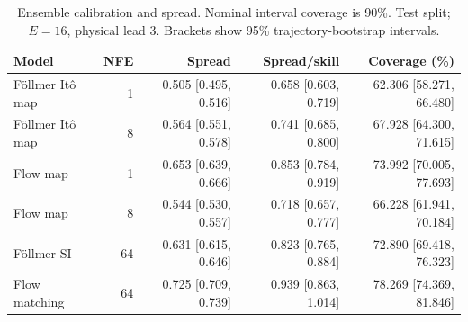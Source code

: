 \begin{table}[t]
\centering
\small
\setlength{\tabcolsep}{3pt}
\caption{Ensemble calibration and spread. Nominal interval coverage is 90\%. Test split; $E=16$, physical lead 3. Brackets show 95\% trajectory-bootstrap intervals.}
\label{tab:map-calibration}
\begin{tabular}{lrrrr}
\toprule
Model & NFE & Spread & Spread/skill & Coverage (\%) \\
\midrule
Föllmer Itô map & 1 & 0.505 [0.495, 0.516] & 0.658 [0.603, 0.719] & 62.306 [58.271, 66.480] \\
Föllmer Itô map & 8 & 0.564 [0.551, 0.578] & 0.741 [0.685, 0.800] & 67.928 [64.300, 71.615] \\
\addlinespace
Flow map & 1 & 0.653 [0.639, 0.666] & 0.853 [0.784, 0.919] & 73.992 [70.005, 77.693] \\
Flow map & 8 & 0.544 [0.530, 0.557] & 0.718 [0.657, 0.777] & 66.228 [61.941, 70.184] \\
\addlinespace
Föllmer SI & 64 & 0.631 [0.615, 0.646] & 0.823 [0.765, 0.884] & 72.890 [69.418, 76.323] \\
\addlinespace
Flow matching & 64 & 0.725 [0.709, 0.739] & 0.939 [0.863, 1.014] & 78.269 [74.369, 81.846] \\
\bottomrule
\end{tabular}
\end{table}
